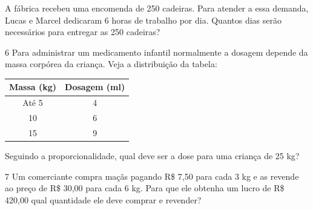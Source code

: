 \begin{escolha}
\begin{boxmedio}
\begin{boxmedio}
{\begin{boxpeq}
\begin{boxpeq}
{\begin{boxpeq}
\begin{boxmedio}
\begin{boxmedio}
\begin{boxpeq}
\begin{boxmedio}
\begin{boxpeq}
\begin{boxpeq}
\begin{boxpeq}
\begin{boxpeq}
\begin{boxmedio}
{\begin{boxmedio}
\begin{boxmedio}
\begin{boxpeq}
\begin{boxmedio}
\begin{boxpeq}
\begin{boxpeq}
\begin{boxpeq}
\begin{escolha}
{\begin{boxmedio}
\begin{boxpeq}
\begin{boxpeq}
\begin{boxpeq}
\begin{boxpeq}
\begin{boxpeq}
\begin{boxmedio}
\begin{boxpeq}
\begin{boxpeq}
\begin{boxpeq}
{\begin{boxpeq}
\begin{boxmedio}
\begin{boxpeq}
A fábrica recebeu uma encomenda de 250 cadeiras. Para atender a essa demanda,
Lucas e Marcel dedicaram 6 horas de trabalho por dia. Quantos dias serão
necessários para entregar as 250 cadeiras?


\num{6} Para administrar um medicamento infantil normalmente a dosagem
depende da massa corpórea da criança. Veja a distribuição da tabela:

\begin{table}[]
\begin{tabular}{|c|c|}
\hline
\rowcolor[HTML]{DAE8FC} 
\textbf{Massa (kg)} & \textbf{Dosagem (ml)} \\ \hline
Até 5 & 4 \\ \hline
10 & 6 \\ \hline
15 & 9 \\ \hline
\end{tabular}
\end{table}

Seguindo a proporcionalidade, qual deve ser a dose para uma criança de 25
kg?

\begin{boxpeq}


\num{7} Um comerciante compra maçãs pagando R\$ 7,50 para cada 3 kg e as
revende ao preço de R\$ 30,00 para cada 6 kg. Para que ele obtenha um
lucro de R\$ 420,00 qual quantidade ele deve comprar e revender?


\end{boxpeq}
\end{boxpeq}
\end{boxmedio}
\end{boxpeq}}
\end{boxpeq}
\end{boxpeq}
\end{boxpeq}
\end{boxmedio}
\end{boxpeq}
\end{boxpeq}
\end{boxpeq}
\end{boxpeq}
\end{boxpeq}
\end{boxmedio}}
\end{escolha}
\end{boxpeq}
\end{boxpeq}
\end{boxpeq}
\end{boxmedio}
\end{boxpeq}
\end{boxmedio}
\end{boxmedio}}
\end{boxmedio}
\end{boxpeq}
\end{boxpeq}
\end{boxpeq}
\end{boxpeq}
\end{boxmedio}
\end{boxpeq}
\end{boxmedio}
\end{boxmedio}
\end{boxpeq}}
\end{boxpeq}
\end{boxpeq}}
\end{boxmedio}
\end{boxmedio}
\end{escolha}
